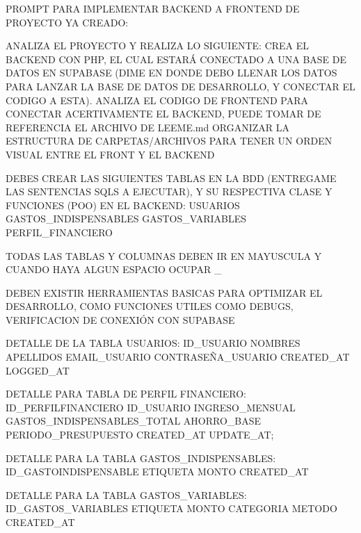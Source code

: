 PROMPT PARA IMPLEMENTAR BACKEND A FRONTEND DE PROYECTO YA CREADO:

ANALIZA EL PROYECTO Y REALIZA LO SIGUIENTE:
CREA EL BACKEND CON PHP, EL CUAL ESTARÁ CONECTADO A UNA BASE DE DATOS EN SUPABASE (DIME EN DONDE DEBO LLENAR LOS DATOS PARA LANZAR LA BASE DE DATOS DE DESARROLLO, Y CONECTAR EL CODIGO A ESTA).
ANALIZA EL CODIGO DE FRONTEND PARA CONECTAR ACERTIVAMENTE EL BACKEND, PUEDE TOMAR DE REFERENCIA EL ARCHIVO DE LEEME.md
ORGANIZAR LA ESTRUCTURA DE CARPETAS/ARCHIVOS PARA TENER UN ORDEN VISUAL ENTRE EL FRONT Y EL BACKEND

DEBES CREAR LAS SIGUIENTES TABLAS EN LA BDD (ENTREGAME LAS SENTENCIAS SQLS A EJECUTAR), Y SU RESPECTIVA CLASE Y FUNCIONES (POO) EN EL BACKEND:
USUARIOS
GASTOS_INDISPENSABLES
GASTOS_VARIABLES
PERFIL_FINANCIERO

TODAS LAS TABLAS Y COLUMNAS DEBEN IR EN MAYUSCULA Y CUANDO HAYA ALGUN ESPACIO OCUPAR _

DEBEN EXISTIR HERRAMIENTAS BASICAS PARA OPTIMIZAR EL DESARROLLO, COMO FUNCIONES UTILES COMO DEBUGS, VERIFICACION DE CONEXIÓN CON SUPABASE


DETALLE DE LA TABLA USUARIOS:
    ID_USUARIO
    NOMBRES
    APELLIDOS
    EMAIL_USUARIO
    CONTRASEÑA_USUARIO
    CREATED_AT
    LOGGED_AT

DETALLE PARA TABLA DE PERFIL FINANCIERO:
    ID_PERFILFINANCIERO
    ID_USUARIO
    INGRESO_MENSUAL
    GASTOS_INDISPENSABLES_TOTAL
    AHORRO_BASE
    PERIODO_PRESUPUESTO
    CREATED_AT
    UPDATE_AT;
        
DETALLE PARA LA TABLA GASTOS_INDISPENSABLES:
    ID_GASTOINDISPENSABLE
    ETIQUETA
    MONTO
    CREATED_AT
    
DETALLE PARA LA TABLA GASTOS_VARIABLES:
    ID_GASTOS_VARIABLES
    ETIQUETA
    MONTO
    CATEGORIA
    METODO
    CREATED_AT
